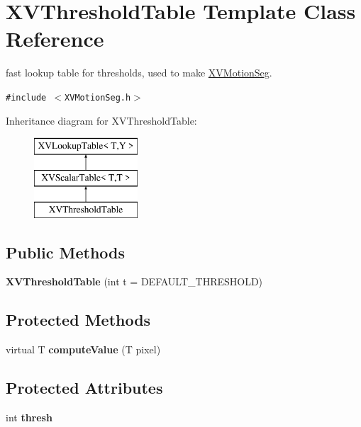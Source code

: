 \hypertarget{class_XVThresholdTable}{
\section{XVThreshold\-Table  Template Class Reference}
\label{XVThresholdTable}
}
fast lookup table for thresholds, used to make \hyperlink{class_XVMotionSeg}{XVMotion\-Seg}. 


{\tt \#include $<$XVMotion\-Seg.h$>$}

Inheritance diagram for XVThreshold\-Table:\begin{figure}[H]
\begin{center}
\leavevmode
\includegraphics[height=3cm]{class_XVThresholdTable}
\end{center}
\end{figure}
\subsection*{Public Methods}
\begin{CompactItemize}
\item 
\label{XVThresholdTable_a0}
\hypertarget{class_XVThresholdTable_a0}{
{\bf XVThreshold\-Table} (int t = DEFAULT\_\-THRESHOLD)}

\end{CompactItemize}
\subsection*{Protected Methods}
\begin{CompactItemize}
\item 
virtual T {\bf compute\-Value} (T pixel)
\end{CompactItemize}
\subsection*{Protected Attributes}
\begin{CompactItemize}
\item 
int {\bf thresh}
\end{CompactItemize}


